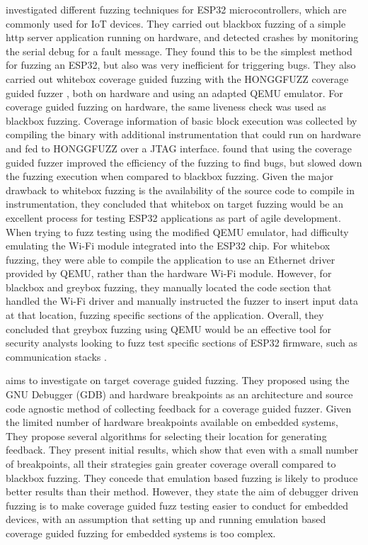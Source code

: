 \documentclass[../report.tex]{subfiles}
\begin{document}
\citet{Borsig_2020} investigated different fuzzing techniques for ESP32
microcontrollers, which are commonly used for IoT devices. They carried out
blackbox fuzzing of a simple http server application running on hardware, and
detected crashes by monitoring the serial debug for a fault message. They found
this to be the simplest method for fuzzing an ESP32, but also was very
inefficient for triggering bugs. They also carried out whitebox coverage guided
fuzzing with the HONGGFUZZ coverage guided fuzzer \citep{Honggfuzz}, both on
hardware and using an adapted QEMU emulator. For coverage guided fuzzing on
hardware, the same liveness check was used as blackbox fuzzing. Coverage
information of basic block execution was collected by compiling the binary with
additional instrumentation that could run on hardware and fed to HONGGFUZZ over
a JTAG interface. \citet{Borsig_2020} found that using the coverage guided
fuzzer improved the efficiency of the fuzzing to find bugs, but slowed down the
fuzzing execution when compared to blackbox fuzzing. Given the major drawback
to whitebox fuzzing is the availability of the source code to compile in
instrumentation, they concluded that whitebox on target fuzzing would be an
excellent process for testing ESP32 applications as part of agile development.
When trying to fuzz testing using the modified QEMU emulator,
\citet{Borsig_2020} had difficulty emulating the Wi-Fi module integrated into
the ESP32 chip. For whitebox fuzzing, they were able to compile the application
to use an Ethernet driver provided by QEMU, rather than the hardware Wi-Fi
module. However, for blackbox and greybox fuzzing, they manually located the
code section that handled the Wi-Fi driver and manually instructed the fuzzer to
insert input data at that location, fuzzing specific sections of the
application. Overall, they concluded that greybox fuzzing using QEMU would be
an effective tool for security analysts looking to fuzz test specific sections
of ESP32 firmware, such as communication stacks \citep{Borsig_2020}.

\citet{Eisele_2022} aims to investigate on target coverage guided fuzzing. They
proposed using the GNU Debugger (GDB) and hardware breakpoints as an
architecture and source code agnostic method of collecting feedback for a
coverage guided fuzzer. Given the limited number of hardware breakpoints
available on embedded systems, They propose several algorithms for selecting
their location for generating feedback. They present initial results, which
show that even with a small number of breakpoints, all their strategies gain
greater coverage overall compared to blackbox fuzzing. They concede that
emulation based fuzzing is likely to produce better results than their method.
However, they state the aim of debugger driven fuzzing is to make coverage
guided fuzz testing easier to conduct for embedded devices, with an assumption
that setting up and running emulation based coverage guided fuzzing for
embedded systems is too complex.
\end{document}
